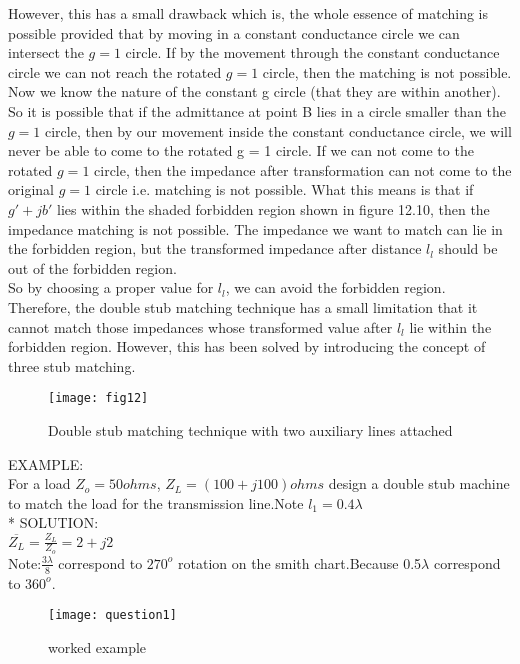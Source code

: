 However, this has a small drawback which is, the whole essence of matching is possible provided that by moving in a constant conductance circle we can intersect the $g = 1$ circle. If by the movement through the constant conductance circle we can not reach the rotated $g = 1$ circle, then the matching is not possible. Now we know the nature of the constant g circle (that they are within another). So it is possible that if the admittance at point B lies in a circle smaller than the $g = 1$ circle, then by our movement inside the constant conductance circle, we will never be able to come to the rotated g = 1 circle. If we can not come to the rotated $g = 1$ circle, then the impedance after transformation can not come to the original $g =1$ circle i.e. matching is not possible. What this means is that if $g' + jb'$ lies within the shaded forbidden region shown in figure 12.10, then the impedance matching is not possible. The impedance we want to match can lie in the forbidden region, but the transformed impedance after distance $ l_l$ should be out of the forbidden region.\\

So by choosing a proper value for $l_l$, we can avoid the forbidden region. Therefore, the double stub matching technique has a small limitation that it cannot match those impedances whose transformed value after $l_l$ lie within the forbidden region. However, this has been solved by introducing the concept of three stub matching.%

\begin{figure}[h]
	\centering
	\texttt{[image: fig12]}
	\caption{Double stub matching technique with two auxiliary lines attached}
\end{figure} 
                                   
EXAMPLE:\\
For a load $Z_{o} = 50ohms$, $Z_{L} = (100 + j100)ohms$ design a double stub machine to match the load for the transmission line.Note $l_{1} = 0.4\lambda$\\*
            SOLUTION:\\
            
$\overline{Z_{L}} = \frac{Z_{L}}{Z_{o}} = 2 + j2$  \\
         
Note:$\frac{3\lambda}{8}$ correspond to $270^{o} $ rotation on the smith chart.Because 0.5$\lambda$ correspond to $ 360^{o}$. 
\begin{figure}[h]
	\centering
	\texttt{[image: question1]}
	\caption{worked example}
\end{figure}
                                                    
